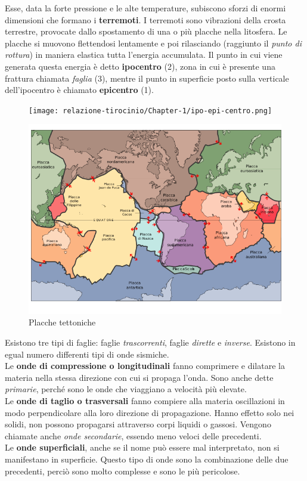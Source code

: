 \documentclass[a4paper,10pt]{memoir}
\begin{document}
Esse, data la forte pressione e le alte temperature, subiscono sforzi di enormi dimensioni che formano i \textbf{terremoti}.
I terremoti sono vibrazioni della crosta terrestre, provocate dallo spostamento  di una o più placche nella litosfera.
Le placche si muovono flettendosi lentamente e poi rilasciando (raggiunto il \textit{punto di rottura}) in maniera elastica tutta l'energia accumulata.
Il punto in cui viene generata questa energia è detto \textbf{ipocentro} (2), zona in cui è presente una frattura chiamata \textit{faglia} (3), mentre il punto in superficie posto sulla verticale dell'ipocentro è chiamato \textbf{epicentro} (1).
\begin{figure}[ht]
\label{fig:ipocentro}
\centering
\texttt{[image: relazione-tirocinio/Chapter-1/ipo-epi-centro.png]}
\end{figure}

\clearpage

\begin{figure}
\caption{Placche tettoniche}
\label{fig:placchetettoniche}
\includegraphics[width=1\textwidth]{Chapter-1/placche-tettoniche.png}
\end{figure}
Esistono tre tipi di faglie: faglie \textit{trascorrenti}, faglie \textit{dirette} e \textit{inverse}.
Esistono in egual numero differenti tipi di onde sismiche.
\\
Le \textbf{onde di compressione o longitudinali} fanno comprimere e dilatare la materia nella stessa direzione con cui si propaga l'onda.
Sono anche dette \textit{primarie}, perché sono le onde che viaggiano a velocità più elevate.
\\
Le \textbf{onde di taglio o trasversali} fanno compiere alla materia oscillazioni in modo perpendicolare alla loro direzione di propagazione. Hanno effetto solo nei solidi, non possono propagarsi attraverso corpi liquidi o gassosi.
Vengono chiamate anche \textit{onde secondarie}, essendo meno veloci delle precedenti.
\\
Le \textbf{onde superficiali}, anche se il nome può essere mal interpretato, non si manifestano in superficie. Questo tipo di onde sono la combinazione delle due precedenti, perciò sono molto complesse e sono le più pericolose. 
\end{document}
